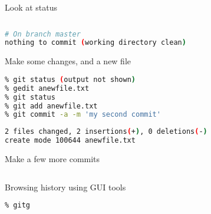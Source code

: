 \documentclass{beamer}
\begin{document}
\begin{frame}[fragile]
\begin{block}{Look at status}
\begin{lstlisting}[language=bash,basicstyle=\ttfamily\scriptsize,breaklines=true]
% git status
\end{lstlisting}
\begin{lstlisting}[language=bash,basicstyle=\sl\ttfamily\scriptsize]
# On branch master
nothing to commit (working directory clean)
\end{lstlisting}
\end{block}

\begin{block}{Make some changes, and a new file}
\begin{lstlisting}[language=bash,basicstyle=\ttfamily\scriptsize,breaklines=true]
% gedit myfile.txt
% git status (output not shown)
% gedit anewfile.txt
% git status
% git add anewfile.txt
% git commit -a -m 'my second commit'
\end{lstlisting}

\begin{lstlisting}[language=bash,basicstyle=\sl\ttfamily\scriptsize]
2 files changed, 2 insertions(+), 0 deletions(-)
create mode 100644 anewfile.txt
\end{lstlisting}

\end{block}



\begin{block}{Make a few more commits}
\begin{lstlisting}[language=bash,basicstyle=\ttfamily\scriptsize,breaklines=true]
% gedit / git add / git commit / ...
\end{lstlisting}
\end{block}
\end{frame}


\begin{frame}[fragile]
\begin{block}{Browsing history using GUI tools}
\begin{lstlisting}[language=bash,basicstyle=\ttfamily\scriptsize,breaklines=true]
% git log 
% gitg
\end{lstlisting}

\end{block}
\end{frame}
\end{document}
